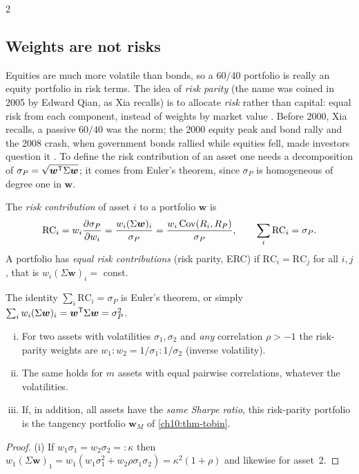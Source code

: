 \begin{paracol}{2}
\subsection{Weights are not risks}
Equities are much more volatile than bonds, so a $60/40$ portfolio is really an equity portfolio in risk terms.
The idea of \emph{risk parity} (the name was coined in 2005 by Edward Qian, as Xia recalls) is to allocate
\emph{risk} rather than capital: equal risk from each component, instead of weights by market value
. Before 2000, Xia recalls, a passive $60/40$ was the norm; the
2000 equity peak and bond rally and the 2008 crash, when government bonds rallied while equities fell, made
investors question it . To define the risk contribution of an asset one
needs a decomposition of $\sigma_P=\sqrt{\bm w^{\mathsf T}\Sigma\bm w}$; it comes from Euler's theorem, since $\sigma_P$ is
homogeneous of degree one in $\bm w$.

\begin{definition}\label{ch10:def-rc}
The \emph{risk contribution} of asset $i$ to a portfolio $\bm w$ is
\[
  \mathrm{RC}_i=w_i\frac{\partial\sigma_P}{\partial w_i}=\frac{w_i(\Sigma\bm w)_i}{\sigma_P}=\frac{w_i\operatorname{Cov}(R_i,R_P)}{\sigma_P},
  \qquad \sum_i\mathrm{RC}_i=\sigma_P .
\]
A portfolio has \emph{equal risk contributions} (risk parity, ERC) if $\mathrm{RC}_i=\mathrm{RC}_j$ for all $i,j$, that is
$w_i(\Sigma\bm w)_i=$ const.
\end{definition}
The identity $\sum_i\mathrm{RC}_i=\sigma_P$ is Euler's theorem, or simply $\sum_iw_i(\Sigma\bm w)_i=\bm w^{\mathsf T}\Sigma\bm w=\sigma_P^2$.

\begin{proposition}\label{ch10:prop-rp}
\leavevmode
\begin{enumerate}[(i)]
  \item For two assets with volatilities $\sigma_1,\sigma_2$ and \emph{any} correlation $\rho>-1$ the risk-parity
      weights are $w_1:w_2=1/\sigma_1:1/\sigma_2$ (inverse volatility).
  \item The same holds for $m$ assets with equal
      pairwise correlations, whatever the volatilities.
  \item If, in addition, all assets have the \emph{same Sharpe
      ratio}, this risk-parity portfolio is the tangency portfolio $\bm w_M$ of \cref{ch10:thm-tobin}.
\end{enumerate}
\end{proposition}
\begin{proof}
(i) If $w_1\sigma_1=w_2\sigma_2=:\kappa$ then $w_1(\Sigma\bm w)_1=w_1(w_1\sigma_1^2+w_2\rho\sigma_1\sigma_2)=\kappa^2(1+\rho)$ and
likewise for asset~2.


\end{proof}
\end{paracol}
